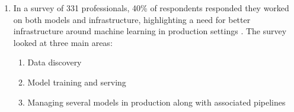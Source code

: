 \documentclass[12pt, a4paper]{article}
\begin{document}
\begin{enumerate}
\item In a survey of 331 professionals, 40\% of respondents responded they worked on both models and infrastructure, highlighting a need for better infrastructure around machine learning in production settings \autocite{makinenWhoNeedsMLOps2021}. The survey looked at three main areas:
\begin{enumerate}
    \item Data discovery 
    \item Model training and serving
    \item Managing several models in production along with associated pipelines
\end{enumerate}


\end{enumerate}

\printbibliography
\end{document}
